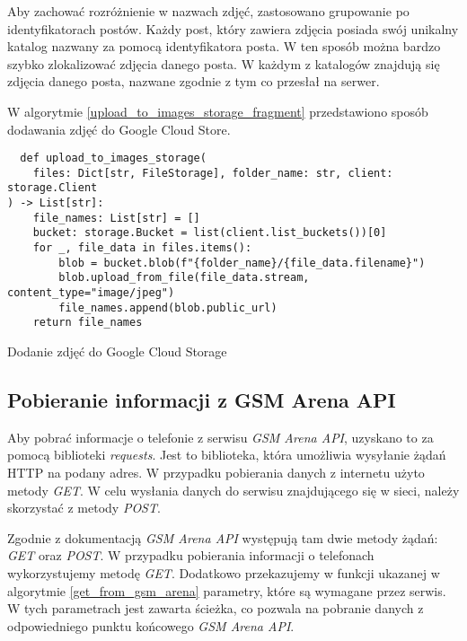 Aby zachować rozróżnienie w nazwach zdjęć, zastosowano grupowanie po identyfikatorach postów. Każdy post, który zawiera zdjęcia posiada swój unikalny katalog nazwany za pomocą identyfikatora posta. W ten sposób można bardzo szybko zlokalizować zdjęcia danego posta. W każdym z katalogów znajdują się zdjęcia danego posta, nazwane zgodnie z tym co przesłał na serwer.

W algorytmie \ref{upload_to_images_storage_fragment} przedstawiono sposób dodawania zdjęć do Google Cloud Store. 

\begin{code}[H]
  \begin{verbatim}
  def upload_to_images_storage(
    files: Dict[str, FileStorage], folder_name: str, client: storage.Client
) -> List[str]:
    file_names: List[str] = []
    bucket: storage.Bucket = list(client.list_buckets())[0]
    for _, file_data in files.items():
        blob = bucket.blob(f"{folder_name}/{file_data.filename}")
        blob.upload_from_file(file_data.stream, content_type="image/jpeg")
        file_names.append(blob.public_url)
    return file_names
  \end{verbatim}
  \caption{Dodanie zdjęć do Google Cloud Storage}
  \label{upload_to_images_storage_fragment}
\end{code}

\subsection{Pobieranie informacji z GSM Arena API}
Aby pobrać informacje o telefonie z serwisu \textit{GSM Arena API}, uzyskano to za pomocą biblioteki \textit{requests}. Jest to biblioteka, która umożliwia wysyłanie żądań HTTP na podany adres. W przypadku pobierania danych z internetu użyto metody \textit{GET}. W celu wysłania danych do serwisu znajdującego się w sieci, należy skorzystać z metody \textit{POST}.

Zgodnie z dokumentacją \textit{GSM Arena API} \cite{gsm_arena_api_reference} występują tam dwie metody żądań: \textit{GET} oraz \textit{POST}. W przypadku pobierania informacji o telefonach wykorzystujemy metodę \textit{GET}. Dodatkowo przekazujemy w funkcji ukazanej w \linebreak algorytmie \ref{get_from_gsm_arena} parametry, które są wymagane przez serwis. W tych parametrach jest zawarta ścieżka, co pozwala na pobranie danych z odpowiedniego punktu końcowego \textit{GSM Arena API}.

